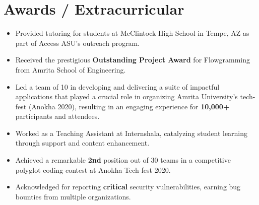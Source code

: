 \documentclass[letterpaper,11pt]{article}
\newcommand{\resumeItem}[1]{
  \item\small{
    {#1 \vspace{-2pt}}
  }
}
\newcommand{\resumeItemListStart}{\begin{itemize}}
\newcommand{\resumeItemListEnd}{\end{itemize}\vspace{-5pt}}
\begin{document}
\section{Awards / Extracurricular}
\resumeItemListStart[leftmargin=0.13in]
\resumeItem{Provided tutoring for students at McClintock High School in Tempe, AZ as part of Access ASU's outreach program.}\vspace{-5pt}
\resumeItem{Received the prestigious \textbf{Outstanding Project Award} for Flowgramming from Amrita School of Engineering.}\vspace{-5pt}
\resumeItem{Led a team of 10 in developing and delivering a suite of impactful applications that played a crucial role in organizing Amrita University's tech-fest (Anokha 2020), resulting in an engaging experience for \textbf{10,000+} participants and attendees.}\vspace{-5pt}
\resumeItem{Worked as a Teaching Assistant at Internshala, catalyzing student learning through support and content enhancement.}\vspace{-5pt}
\resumeItem{Achieved a remarkable \textbf{2nd} position out of 30 teams in a competitive polyglot coding contest at Anokha Tech-fest 2020.}\vspace{-5pt}
\resumeItem{Acknowledged for reporting \textbf{critical} security vulnerabilities, earning bug bounties from multiple organizations.}\vspace{-5pt}
\resumeItemListEnd
\end{document}
